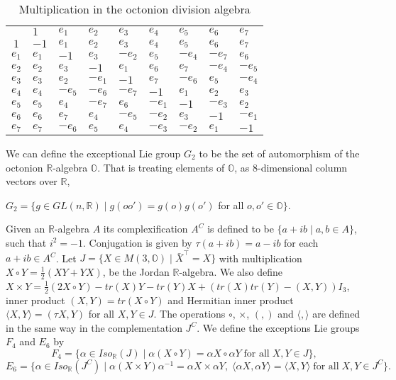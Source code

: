 \documentclass{article}
\theoremstyle{plain}
\theoremstyle{definition}
\numberwithin{thm}{section}
\begin{document}
		\begin{table}[ht]
			\centering
			\caption{Multiplication in the octonion division algebra}
			\label{table:oct}
			\begin{tabular}{c|llllllll}
				 &$1$  &$e_1$&$e_2$&$e_3$&$e_4$&$e_5$&$e_6$&$e_7$ \\
			\cline{1-9}
			$1$&$-1$ &$e_1$&$e_2$&$e_3$&$e_4$&$e_5$&$e_6$&$e_7$  \\
			$e_1$&$e_1$&$-1$ &$e_3$&$-e_2$&$e_5$&$-e_4$&$-e_7$&$e_6$  \\
			$e_2$&$e_2$&$e_3$&$-1$ &$e_1$&$e_6$&$e_7$&$-e_4$&$-e_5$  \\
			$e_3$&$e_3$&$e_2$&$-e_1$&$-1$ &$e_7$&$-e_6$&$e_5$&$-e_4$  \\
			$e_4$&$e_4$&$-e_5$&$-e_6$&$-e_7$&$-1$ &$e_1$&$e_2$&$e_3$  \\
			$e_5$&$e_5$&$e_4$&$-e_7$&$e_6$&$-e_1$&$-1$ &$-e_3$&$e_2$  \\
			$e_6$&$e_6$&$e_7$&$e_4$&$-e_5$&$-e_2$&$e_3$&$-1$ &$-e_1$  \\
			$e_7$&$e_7$&$-e_6$&$e_5$&$e_4$&$-e_3$&$-e_2$&$e_1$&$-1$ 
			\end{tabular}
		\end{table}
		
		We can define the exceptional Lie group $G_2$ to be the set of automorphism of the octonion $\mathbb{R}$-algebra $\mathbb{O}$.
		That is treating elements of $\mathbb{O}$, as $8$-dimensional column vectors over $\mathbb{R}$,
		\begin{center}
			$G_2=\{ g \in GL(n,\mathbb{R}) \;|\; g(oo')=g(o)g(o') $ for all $ o,o'\in\mathbb{O} \}$.
		\end{center}
		Given an $\mathbb{R}$-algebra $A$ its complexification $A^C$ is defined to be $\{ a+ib \; | \; a,b\in A \}$, such that $i^2=-1$.
		Conjugation is given by $\tau(a+ib)=a-ib$ for each $a+ib\in A^C$. 
		Let $J=\{ X\in M(3,\mathbb{O}) \;|\; \bar{X}^{\intercal}=X \}$ with multiplication $X\circ Y = \frac{1}{2}(XY+YX)$, be the Jordan $\mathbb{R}$-algebra.
		We also define $X\times Y=\frac{1}{2}(2X\circ Y)-tr(X)Y-tr(Y)X+(tr(X)tr(Y)-(X,Y))I_3$, inner product $(X,Y)=tr(X\circ Y)$ and
		Hermitian inner product $\langle X,Y \rangle=(\tau X,Y)$ for all $X,Y\in J$.
		The operations $\circ$, $\times$, $(,)$ and $\langle,\rangle$ are defined in the same way in the complementation $J^C$.
		We define the exceptions Lie groups $F_4$ and $E_6$ by
		\begin{equation*}
			F_4=\{ \alpha \in Iso_{\mathbb{R}}(J) \; | \; \alpha(X\circ Y)=\alpha X \circ \alpha Y \; \text{for all} \; X,Y\in J \},
		\end{equation*}
		\begin{equation*}
			E_6=\{ \alpha \in Iso_{\mathbb{R}}(J^C) \; | \; \alpha(X\times Y)\alpha^{-1}=\alpha X \times \alpha Y,
					\; \langle\alpha X,\alpha Y\rangle =\langle X,Y \rangle \; \text{for all} \; X,Y\in {J^C} \}.
		\end{equation*}
		
\end{document}
